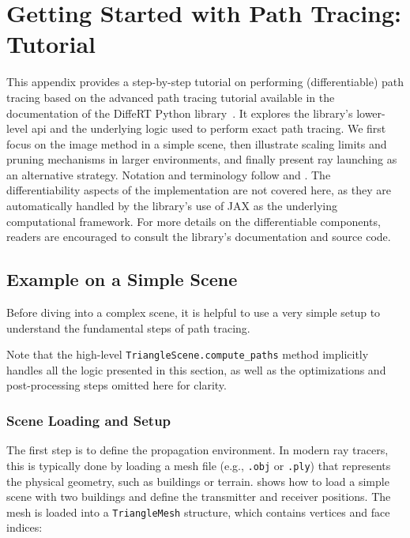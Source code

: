 \chapter{Getting Started with Path Tracing: Tutorial}

This appendix provides a step-by-step tutorial on performing (differentiable) path tracing based on the advanced path tracing tutorial available in the documentation of the DiffeRT Python library~. It explores the library's lower-level \gls{api} and the underlying logic used to perform exact path tracing. We first focus on the image method in a simple scene, then illustrate scaling limits and pruning mechanisms in larger environments, and finally present ray launching as an alternative strategy. Notation and terminology follow  and . The differentiability aspects of the implementation are not covered here, as they are automatically handled by the library's use of JAX as the underlying computational framework. For more details on the differentiable components, readers are encouraged to consult the library's documentation and source code.

\section{Example on a Simple Scene}
\label{sec:tutorial_simple_scene}

Before diving into a complex scene, it is helpful to use a very simple setup to understand the fundamental steps of path tracing.

Note that the high-level \texttt{TriangleScene.compute\_paths} method implicitly handles all the logic presented in this section, as well as the optimizations and post-processing steps omitted here for clarity.

\subsection{Scene Loading and Setup}
\label{sec:rt_step1}

The first step is to define the propagation environment. In modern ray tracers, this is typically done by loading a mesh file (e.g., \texttt{.obj} or \texttt{.ply}) that represents the physical geometry, such as buildings or terrain.  shows how to load a simple scene with two buildings and define the transmitter and receiver positions. The mesh is loaded into a \texttt{TriangleMesh} structure, which contains vertices and face indices:


